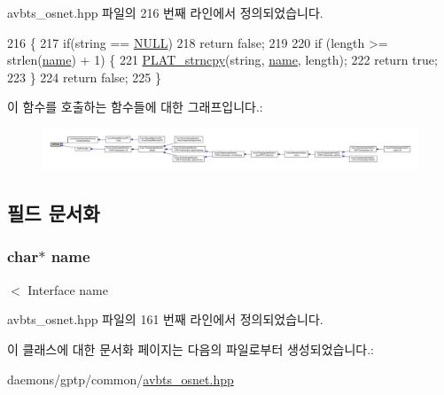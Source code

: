 avbts\+\_\+osnet.\+hpp 파일의 216 번째 라인에서 정의되었습니다.


\begin{DoxyCode}
216                                                \{
217         \textcolor{keywordflow}{if}(\textcolor{keywordtype}{string} == \hyperlink{openavb__types__base__pub_8h_a070d2ce7b6bb7e5c05602aa8c308d0c4}{NULL})
218             \textcolor{keywordflow}{return} \textcolor{keyword}{false};
219 
220         \textcolor{keywordflow}{if} (length >= strlen(\hyperlink{class_interface_name_a5ac083a645d964373f022d03df4849c8}{name}) + 1) \{
221             \hyperlink{linux_2src_2platform_8hpp_aed44a46556a58734a7351ddc2bfdb978}{PLAT\_strncpy}(\textcolor{keywordtype}{string}, \hyperlink{class_interface_name_a5ac083a645d964373f022d03df4849c8}{name}, length);
222             \textcolor{keywordflow}{return} \textcolor{keyword}{true};
223         \}
224         \textcolor{keywordflow}{return} \textcolor{keyword}{false};
225     \}
\end{DoxyCode}


이 함수를 호출하는 함수들에 대한 그래프입니다.\+:
\nopagebreak
\begin{figure}[H]
\begin{center}
\leavevmode
\includegraphics[width=350pt]{class_interface_name_a92a0be2fe51f7da8a6073637d8b7c518_icgraph}
\end{center}
\end{figure}




\subsection{필드 문서화}
\subsubsection[{\texorpdfstring{name}{name}}]{\setlength{\rightskip}{0pt plus 5cm}char$\ast$ name\hspace{0.3cm}{\ttfamily [private]}}\hypertarget{class_interface_name_a5ac083a645d964373f022d03df4849c8}{}\label{class_interface_name_a5ac083a645d964373f022d03df4849c8}


$<$ Interface name 



avbts\+\_\+osnet.\+hpp 파일의 161 번째 라인에서 정의되었습니다.



이 클래스에 대한 문서화 페이지는 다음의 파일로부터 생성되었습니다.\+:\begin{DoxyCompactItemize}
\item 
daemons/gptp/common/\hyperlink{avbts__osnet_8hpp}{avbts\+\_\+osnet.\+hpp}\end{DoxyCompactItemize}
